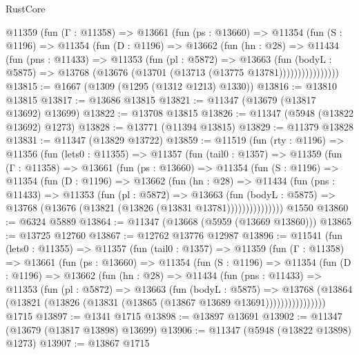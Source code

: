 \begin{lexlean}{RustCore}
\begin{coremodule}
          @11359
            (fun (Γ : @11358) =>
            @13661
              (fun (ps : @13660) =>
              @11354
                (fun (S : @1196) =>
                @11354
                  (fun (D : @1196) =>
                  @13662
                    (fun (hn : @28) =>
                    @11434
                      (fun (pns : @11433) =>
                      @11353
                        (fun (pl : @5872) =>
                        @13663
                          (fun (bodyL : @5875) =>
                          @13768 (@13676 (@13701 (@13713 (@13775 @13781))))))))))))))))
@13815 := @1667 (@1309 (@1295 (@1312 @1213) @1330))
@13816 := @13810 @13815
@13817 := @13686 @13815
@13821 := @11347 (@13679 (@13817 @13692) @13699)
@13822 := @13708 @13815
@13826 := @11347 (@5948 (@13822 @13692) @1273)
@13828 := @13771 (@11394 @13815)
@13829 := @11379 @13828
@13831 := @11347 (@13829 @13722)
@13859 := @11519
    (fun (rty : @1196) =>
    @11356
      (fun (lets0 : @11355) =>
      @11357
        (fun (tail0 : @1357) =>
        @11359
          (fun (Γ : @11358) =>
          @13661
            (fun (ps : @13660) =>
            @11354
              (fun (S : @1196) =>
              @11354
                (fun (D : @1196) =>
                @13662
                  (fun (hn : @28) =>
                  @11434
                    (fun (pns : @11433) =>
                    @11353
                      (fun (pl : @5872) =>
                      @13663
                        (fun (bodyL : @5875) =>
                        @13768 (@13676 (@13821 (@13826 (@13831 @13781)))))))))))))))
    @1550
@13860 := @6324 @5889
@13864 := @11347 (@13668 (@5959 (@13669 @13860)))
@13865 := @13725 @12760
@13867 := @12762 @13776 @12987
@13896 := @11541
    (fun (lets0 : @11355) =>
    @11357
      (fun (tail0 : @1357) =>
      @11359
        (fun (Γ : @11358) =>
        @13661
          (fun (ps : @13660) =>
          @11354
            (fun (S : @1196) =>
            @11354
              (fun (D : @1196) =>
              @13662
                (fun (hn : @28) =>
                @11434
                  (fun (pns : @11433) =>
                  @11353
                    (fun (pl : @5872) =>
                    @13663
                      (fun (bodyL : @5875) =>
                      @13768
                        (@13864
                          (@13821 (@13826 (@13831 (@13865 (@13867 @13689 @13691))))))))))))))))
    @1715
@13897 := @1341 @1715
@13898 := @13897 @13691
@13902 := @11347 (@13679 (@13817 @13898) @13699)
@13906 := @11347 (@5948 (@13822 @13898) @1273)
@13907 := @13867 @1715

\end{coremodule}
\end{lexlean}
